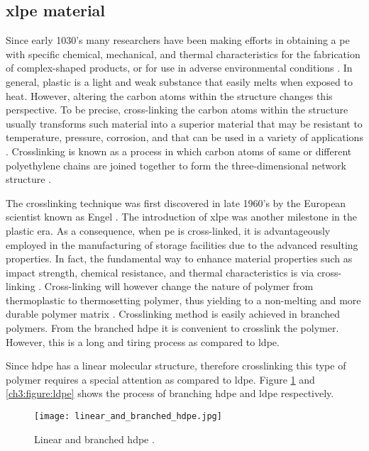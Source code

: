 \subsection{\Acrfull{xlpe} material}

Since early 1030's many researchers have been making efforts in obtaining a \acrshort{pe} with specific chemical, mechanical, and thermal characteristics for the fabrication of complex-shaped products, or for use in adverse environmental conditions \cite{kurtz2009cross}. In general, plastic is a light and weak substance that easily melts when exposed to heat. However, altering the carbon atoms within the structure changes this perspective. To be precise, cross-linking the carbon atoms within the structure usually transforms such material into a superior material that may be resistant to temperature, pressure, corrosion, and that can be used in a variety of applications \cite{meola2005cross}. Crosslinking is known as a process in which carbon atoms of same or different polyethylene chains are joined together to form the three-dimensional network structure \cite{kurtz2009cross}.

The crosslinking technique was first discovered in late 1960's by the European scientist known as Engel \cite{meola2005cross}. The introduction of \acrfull{xlpe} was another milestone in the plastic era. As a consequence, when \acrshort{pe} is cross-linked, it is advantageously employed in the manufacturing of storage facilities due to the advanced resulting properties. In fact, the fundamental way to enhance material properties such as impact strength, chemical resistance, and thermal characteristics is via cross-linking \cite{andreopoulos1986mechanical}. Cross-linking will however change the nature of polymer from thermoplastic to thermosetting polymer, thus yielding to a non-melting and more durable polymer matrix \cite{clemens2017microstructure}. Crosslinking method is easily achieved in branched polymers. From the branched \acrshort{hdpe} it is convenient to crosslink the polymer. However, this is a long and tiring process as compared to \acrshort{ldpe}.

Since \acrshort{hdpe} has a linear molecular structure, therefore crosslinking this type of polymer requires a special attention as compared to \acrshort{ldpe}. Figure \ref{ch3:figure:hdpe} and \ref{ch3:figure:ldpe} shows the process of branching \acrshort{hdpe} and \acrshort{ldpe} respectively.
 
\begin{figure}[H]
    \centering
    \texttt{[image: linear\_and\_branched\_hdpe.jpg]}
    \caption{Linear and branched \acrshort{hdpe} \cite{gabriel1998history}.}
    \label{ch3:figure:hdpe}
\end{figure}

